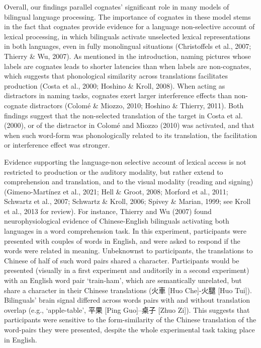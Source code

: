 \documentclass[
  man,
  floatsintext,
  colorlinks=true,linkcolor=blue,citecolor=blue,urlcolor=blue,biblatex]{apa7}
\begin{document}
Overall, our findings parallel cognates' significant role in many models
of bilingual language processing. The importance of cognates in these
model stems in the fact that cognates provide evidence for a language
non-selective account of lexical processing, in which bilinguals
activate unselected lexical representations in both languages, even in
fully monolingual situations (Christoffels et al., 2007; Thierry \& Wu,
2007). As mentioned in the introduction, naming pictures whose labels
are cognates leads to shorter latencies than when labels are
non-cognates, which suggests that phonological similarity across
translations facilitates production (Costa et al., 2000; Hoshino \&
Kroll, 2008). When acting as distractors in naming tasks, cognates exert
larger interference effects than non-cognate distractors (Colomé \&
Miozzo, 2010; Hoshino \& Thierry, 2011). Both findings suggest that the
non-selected translation of the target in Costa et al. (2000), or of the
distractor in Colomé and Miozzo (2010) was activated, and that when such
word-form was phonologically related to its translation, the
facilitation or interference effect was stronger.

Evidence supporting the language-non selective account of lexical access
is not restricted to production or the auditory modality, but rather
extend to comprehension and translation, and to the visual modality
(reading and signing) (Gimeno-Martínez et al., 2021; Hell \& Groot,
2008; Morford et al., 2011; Schwartz et al., 2007; Schwartz \& Kroll,
2006; Spivey \& Marian, 1999; see Kroll et al., 2013 for review). For
instance, Thierry and Wu (2007) found neurophysiological evidence of
Chinese-English bilinguals activating both languages in a word
comprehension task. In this experiment, participants were presented with
couples of words in English, and were asked to respond if the words were
related in meaning. Unbeknownst to participants, the translations to
Chinese of half of such word pairs shared a character. Participants
would be presented (visually in a first experiment and auditorily in a
second experiment) with an English word pair `train-ham', which are
semantically unrelated, but share a character in their Chinese
translations (\foreignlanguage{chinese-simplified}{火車} {[}Huo
Che{]}-\foreignlanguage{chinese-simplified}{火腿} {[}Huo Tui{]}).
Bilinguals' brain signal differed across words pairs with and without
translation overlap (e.g., `apple-table',
\foreignlanguage{chinese-simplified}{平果} {[}Ping
Guo{]}--\foreignlanguage{chinese-simplified}{桌子} {[}Zhuo Zi{]}). This
suggests that participants were sensitive to the form-similarity of the
Chinese translation of the word-pairs they were presented, despite the
whole experimental task taking place in English.
\end{document}
